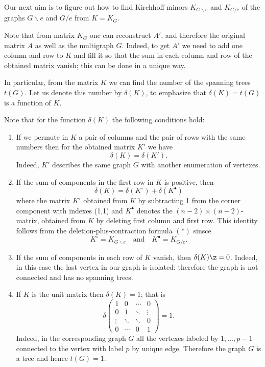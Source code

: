 
Our next aim is to figure out how to find Kirchhoff minors $K_{G\backslash e}$ and $K_{G/e}$ of the graphs $G\backslash e$ and $G/e$ from $K=K_G$.



Note that from matrix $K_G$ one can reconstruct $A'$, and therefore the original matrix $A$ as well as the multigraph $G$.
Indeed, to get $A'$ we need to add one column and row to $K$ and fill it so that the sum in each column and row of the obtained matrix vanish;
this can be done in a unique way.

In particular, from the matrix $K$ we can find the number of the spanning trees $t(G)$.
Let us denote this number by $\delta(K)$, to emphasize that $\delta(K)=t(G)$ is a function of $K$.

Note that for the function $\delta(K)$ the following conditions hold:
\begin{enumerate}
\item\label{delata-1} If we permute in $K$ a pair of columns and the pair of rows with the same numbers then for the obtained matrix $K'$ we have 
\[\delta(K)=\delta(K').\]
Indeed, $K'$ describes the same graph $G$ with another enumeration of vertexes.

\item \label{delata-2}
If the sum of components in the first row in $K$ is positive, then
\[\delta(K)=\delta(K^{\circ})+\delta(K^{\bullet})\]
where the matrix $K^{\circ}$ obtained from $K$ by subtracting 1 from the corner component with indexes (1,1) and $K^{\bullet}$ denotes the $(n-2)\times(n-2)$-matrix, obtained from $K$ by deleting first column and first row.
This identity follows from the deletion-plus-contraction formula $({*})$ sinsce \[K^{\circ}=K_{G\backslash e}\quad\text{and}\quad K^{\bullet}=K_{G/e}.\]

\item\label{delata-3} If the sum of components in each row of $K$ vanish, then $\delta(K)\z=0$. 
Indeed, in this case the last vertex in our graph is isolated;
therefore the graph is not connected and has no spanning trees.

\item\label{delata-4} If $K$ is the unit matrix then $\delta(K)=1$;
that is
\[
\delta\left(
\begin{matrix}
1&0&\cdots&0
\\
0&1&\ddots&\vdots
\\
\vdots&\ddots&\ddots&0
\\
0&\cdots&0&1
\end{matrix}
\right)=1.
\]
Indeed, in the corresponding graph $G$ all the vertexes labeled by $1,\dots,p-1$ connected to the vertex with label $p$ by unique edge. 
Therefore the graph $G$ is a tree and hence $t(G)=1$.
\end{enumerate}

